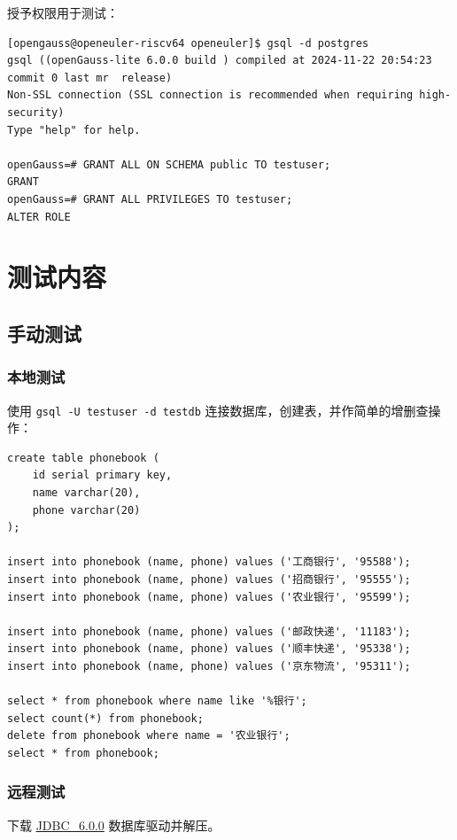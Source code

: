 \documentclass{article}
\begin{document}
授予权限用于测试：

\begin{verbatim}
[opengauss@openeuler-riscv64 openeuler]$ gsql -d postgres
gsql ((openGauss-lite 6.0.0 build ) compiled at 2024-11-22 20:54:23 commit 0 last mr  release)
Non-SSL connection (SSL connection is recommended when requiring high-security)
Type "help" for help.

openGauss=# GRANT ALL ON SCHEMA public TO testuser;
GRANT
openGauss=# GRANT ALL PRIVILEGES TO testuser; 
ALTER ROLE
\end{verbatim}


\section{测试内容}

\subsection{手动测试}

\subsubsection{本地测试}

使用 \verb|gsql -U testuser -d testdb| 连接数据库，创建表，并作简单的增删查操作：

\begin{verbatim}
create table phonebook (
    id serial primary key,
    name varchar(20),
    phone varchar(20)
);

insert into phonebook (name, phone) values ('工商银行', '95588');
insert into phonebook (name, phone) values ('招商银行', '95555');
insert into phonebook (name, phone) values ('农业银行', '95599');

insert into phonebook (name, phone) values ('邮政快递', '11183');
insert into phonebook (name, phone) values ('顺丰快递', '95338');
insert into phonebook (name, phone) values ('京东物流', '95311');

select * from phonebook where name like '%银行';
select count(*) from phonebook;
delete from phonebook where name = '农业银行';
select * from phonebook;
\end{verbatim}

\subsubsection{远程测试}

下载 \href{https://opengauss.org/zh/download/}{JDBC\_6.0.0} 数据库驱动并解压。
\end{document}
